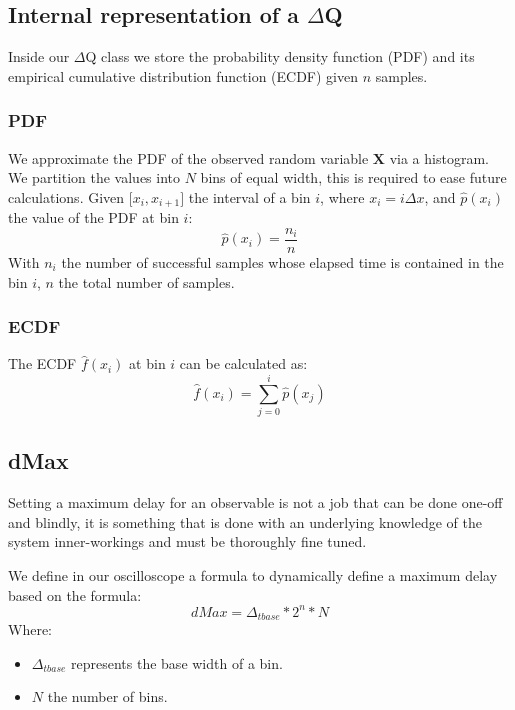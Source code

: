 \subsection{Internal representation of a $\Delta$Q}

        Inside our $\Delta$Q class we store the probability density function (PDF) and its empirical cumulative distribution function (ECDF) given $n$ samples. 
    \subsubsection{PDF}
  We approximate the PDF of the observed random variable $\textbf{X}$ via a histogram. We partition the values into $N$ bins of equal width, this is required to ease future calculations.
        Given $\lbrack x_i, x_{i+1} \rbrack$ the interval of a bin $i$, where $x_i = i\Delta x$, and $\hat{p}(x_i)$ the value of the PDF at bin $i$:
        \begin{equation}
            \hat{p}(x_i) = \dfrac{n_i}{n}
            \label{eq:pdf}
        \end{equation}
   With $n_i$ the number of successful samples whose elapsed time is contained in the bin $i$, $n$ the total number of samples.
\subsubsection{ECDF}
    The ECDF $\hat{f}(x_i)$ at bin $i$ can  be calculated as:
    \begin{equation}
            \hat{f}(x_i) = \sum_{j=0}^{i} \hat{p}(x_j)
        \label{eq:cdf}
    \end{equation}

\subsection{dMax}
Setting a maximum delay for an observable is not a job that can be done one-off and blindly, it is something that is done with an underlying knowledge of the system inner-workings and must be thoroughly fine tuned. 

We define in our oscilloscope a formula to dynamically define a maximum delay based on the formula:
\begin{equation}
    dMax = \Delta_{t base} * 2^n * N  
    \label{eq:dMax}
\end{equation}
Where:
\begin{itemize}
    \item $\Delta_{t base}$ represents the base width of a bin.
    \item $N$ the number of bins.
\end{itemize}


